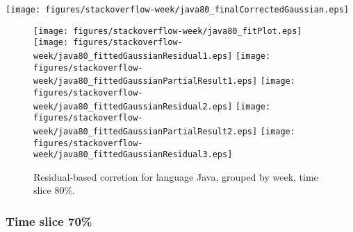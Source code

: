 \begin{center}
{\texttt{[image: figures/stackoverflow-week/java80\_finalCorrectedGaussian.eps]}}
\end{center}

\FloatBarrier

\begin{figure}[t]
\centering
{}
{\texttt{[image: figures/stackoverflow-week/java80\_fitPlot.eps]}}
{\texttt{[image: figures/stackoverflow-week/java80\_fittedGaussianResidual1.eps]}}
{\texttt{[image: figures/stackoverflow-week/java80\_fittedGaussianPartialResult1.eps]}}
{\texttt{[image: figures/stackoverflow-week/java80\_fittedGaussianResidual2.eps]}}
{\texttt{[image: figures/stackoverflow-week/java80\_fittedGaussianPartialResult2.eps]}}
{\texttt{[image: figures/stackoverflow-week/java80\_fittedGaussianResidual3.eps]}}
\caption{Residual-based corretion for language Java, grouped by week, time slice 80\%.}
\end{figure}


\FloatBarrier


\subsubsection{Time slice 70\%}

